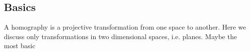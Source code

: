\subsection{Basics}
A homography is a projective transformation from one space to another.
Here we discuss only transformations in two dimensional spaces, i.e. planes.
Maybe the most basic 
